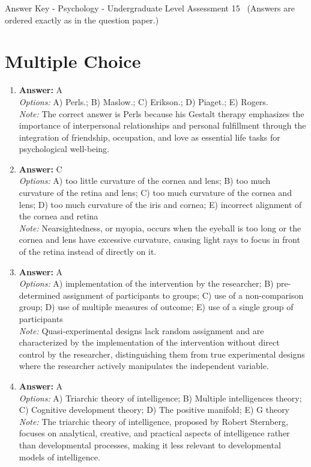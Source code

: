 \documentclass[12pt]{article}
\begin{document}
\begin{center}
Answer Key - Psychology - Undergraduate Level Assessment 15 \
\small (Answers are ordered exactly as in the question paper.)
\end{center}

\section*{Multiple Choice}
\begin{enumerate}[label=\arabic*.]
\item \textbf{Answer:} A
\\ \textit{Options:} A) Perls.; B) Maslow.; C) Erikson.; D) Piaget.; E) Rogers.
\\ \textit{Note:} The correct answer is Perls because his Gestalt therapy emphasizes the importance of interpersonal relationships and personal fulfillment through the integration of friendship, occupation, and love as essential life tasks for psychological well-being.
\item \textbf{Answer:} C
\\ \textit{Options:} A) too little curvature of the cornea and lens; B) too much curvature of the retina and lens; C) too much curvature of the cornea and lens; D) too much curvature of the iris and cornea; E) incorrect alignment of the cornea and retina
\\ \textit{Note:} Nearsightedness, or myopia, occurs when the eyeball is too long or the cornea and lens have excessive curvature, causing light rays to focus in front of the retina instead of directly on it.
\item \textbf{Answer:} A
\\ \textit{Options:} A) implementation of the intervention by the researcher; B) pre-determined assignment of participants to groups; C) use of a non-comparison group; D) use of multiple measures of outcome; E) use of a single group of participants
\\ \textit{Note:} Quasi-experimental designs lack random assignment and are characterized by the implementation of the intervention without direct control by the researcher, distinguishing them from true experimental designs where the researcher actively manipulates the independent variable.
\item \textbf{Answer:} A
\\ \textit{Options:} A) Triarchic theory of intelligence; B) Multiple intelligences theory; C) Cognitive development theory; D) The positive manifold; E) G theory
\\ \textit{Note:} The triarchic theory of intelligence, proposed by Robert Sternberg, focuses on analytical, creative, and practical aspects of intelligence rather than developmental processes, making it less relevant to developmental models of intelligence.

\end{enumerate}
\end{document}
